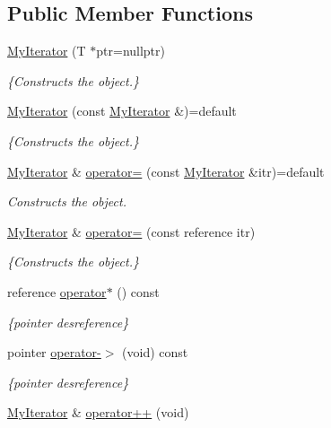 \subsection*{Public Member Functions}
\begin{DoxyCompactItemize}
\item 
\hyperlink{classMyIterator_a7c73c294e14c9f104970350ce48707fd}{My\+Iterator} (T $\ast$ptr=nullptr)
\begin{DoxyCompactList}\small\item\em \{Constructs the object.\} \end{DoxyCompactList}\item 
\hyperlink{classMyIterator_a56b5edf3d70253f7b2f2fd5fc15bca18}{My\+Iterator} (const \hyperlink{classMyIterator}{My\+Iterator} \&)=default
\begin{DoxyCompactList}\small\item\em \{Constructs the object.\} \end{DoxyCompactList}\item 
\hyperlink{classMyIterator}{My\+Iterator} \& \hyperlink{classMyIterator_ab388cff932fc5f108bc530acdb18fa4f}{operator=} (const \hyperlink{classMyIterator}{My\+Iterator} \&itr)=default
\begin{DoxyCompactList}\small\item\em Constructs the object. \end{DoxyCompactList}\item 
\hyperlink{classMyIterator}{My\+Iterator} \& \hyperlink{classMyIterator_ad0d1d4cf8fb2db01a03393a0c704929d}{operator=} (const reference itr)
\begin{DoxyCompactList}\small\item\em \{Constructs the object.\} \end{DoxyCompactList}\item 
reference \hyperlink{classMyIterator_aef723487fdda934f8b6ca6fbd2136e11}{operator$\ast$} () const
\begin{DoxyCompactList}\small\item\em \{pointer desreference\} \end{DoxyCompactList}\item 
pointer \hyperlink{classMyIterator_a2ff4f43ca484f81a899f6b33afe69139}{operator-\/$>$} (void) const
\begin{DoxyCompactList}\small\item\em \{pointer desreference\} \end{DoxyCompactList}\item 
\hyperlink{classMyIterator}{My\+Iterator} \& \hyperlink{classMyIterator_a07598b2a8227dba516a2d40289294a23}{operator++} (void)

\end{DoxyCompactItemize}
